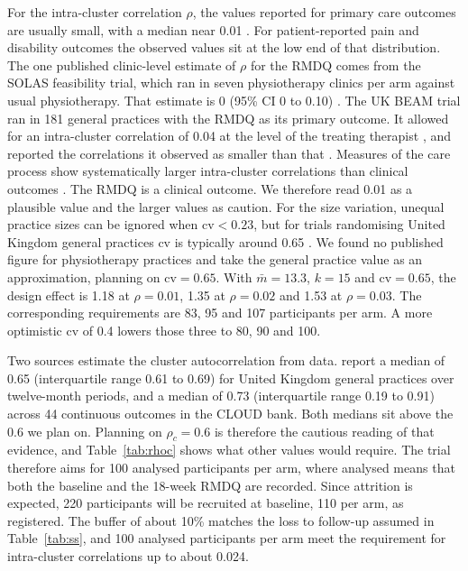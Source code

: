 \documentclass[11pt,a4paper]{article}
\begin{document}
For the intra-cluster correlation $\rho$, the values reported for primary care
outcomes are usually small, with a median near 0.01 \citep{adams2004}. For patient-reported pain and disability outcomes the
observed values sit at the low end of that distribution. The one published
clinic-level estimate of $\rho$ for the RMDQ comes from the SOLAS
feasibility trial, which ran in seven physiotherapy clinics per arm against
usual physiotherapy. That estimate is 0 (95\% CI 0 to 0.10)
\citep{hurley2020, king2023}. The UK BEAM trial ran in 181 general practices
with the RMDQ as its primary outcome. It allowed for an intra-cluster
correlation of 0.04 at the level of the treating therapist
\citep{ukbeam2003}, and reported the
correlations it observed as smaller than that \citep{ukbeam2004}. Measures of
the care process show systematically larger intra-cluster correlations than
clinical outcomes \citep{campbell2005}. The RMDQ is a clinical outcome.
We therefore read 0.01 as a plausible value and the larger values as
caution. For the size variation, unequal practice sizes can be ignored when
$\mathrm{cv} < 0.23$, but for trials randomising United Kingdom general practices $\mathrm{cv}$ is typically around
0.65 \citep{eldridge2006}. We found no published figure for physiotherapy practices and take the general
practice value as an approximation, planning on $\mathrm{cv} = 0.65$. With
$\bar m = 13.3$, $k = 15$ and $\mathrm{cv} = 0.65$, the design effect is 1.18
at $\rho = 0.01$, 1.35 at $\rho = 0.02$ and 1.53 at $\rho = 0.03$. The
corresponding requirements are 83, 95 and 107 participants per arm. A more
optimistic $\mathrm{cv}$ of 0.4 lowers those three to 80, 90 and 100.

Two sources estimate the cluster autocorrelation from data. \citet{martin2016} report a
median of 0.65 (interquartile range 0.61 to 0.69) for United Kingdom general
practices over twelve-month periods, and \citet{korevaar2021} a median of
0.73 (interquartile range 0.19 to 0.91) across 44 continuous outcomes in the
CLOUD bank. Both medians sit above the 0.6 we plan on.
Planning on $\rho_c = 0.6$ is therefore
the cautious reading of that evidence, and Table~\ref{tab:rhoc} shows what
other values would require. The trial
therefore aims for 100 analysed participants per arm, where analysed means
that both the baseline and the 18-week RMDQ are recorded. Since attrition is
expected, 220 participants will be recruited at baseline, 110 per arm, as
registered. The buffer of about 10\% matches the loss to follow-up assumed in
Table~\ref{tab:ss}, and 100 analysed participants per arm meet the
requirement for intra-cluster correlations up to about 0.024.
\end{document}

